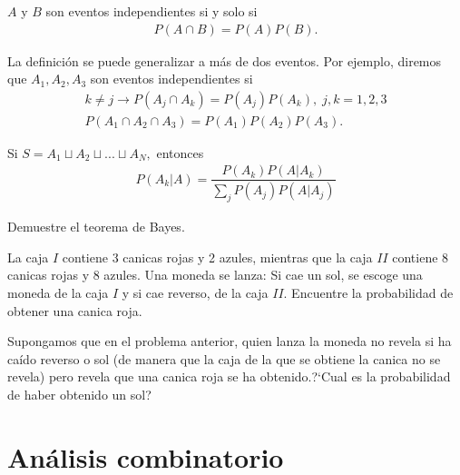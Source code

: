 \begin{defn}
 $A$ y $B$ son eventos independientes si y solo si
 \begin{align}
  \label{eq:0.1.21}
  P(A \cap B) = P(A)P(B).
 \end{align}
\end{defn}


{}
La definición se puede generalizar a más de dos eventos.  Por ejemplo, diremos que $A_{1},A_{2},A_{3}$ son eventos independientes si
\begin{align}
k\neq j \rightarrow P(A_{j} \cap A_{k})=P(A_{j})P(A_{k}), \; j,k=1,2,3 
\\ P(A_{1}\cap A_{2} \cap A_{3})=P(A_{1})P(A_{2})P(A_{3}).
\end{align}


{}
\begin{thm}
 Si $S=A_{1}\sqcup A_{2} \sqcup...\sqcup A_{N},$ entonces
 \begin{align}
  \label{eq:0.1.24}
  P(A_{k}|A) = \dfrac{P(A_{k})P(A|A_{k})}{\sum_{j} P(A_{j})P(A|A_{j})}
 \end{align}

\end{thm}




 \begin{ejemplo}
  \label{exmp:0.1.s16}
  Demuestre el teorema de Bayes.
 \end{ejemplo}



{}
 \begin{ejemplo}
  \label{exmp:0.1.s15}
 La caja $I$ contiene 3 canicas rojas y 2 azules, mientras que la caja $II$ contiene $8$ canicas rojas y 8 azules. Una moneda se lanza: Si cae un sol, se escoge una moneda de la caja $I$ y si cae reverso, de la caja $II.$ Encuentre la probabilidad de obtener una canica roja.
 \end{ejemplo}


{}
 \begin{ejemplo}
  \label{exmp:0.1.s17}
	Supongamos que en el problema anterior, quien lanza la moneda no revela si ha caído reverso o sol (de manera que la caja de la que se obtiene la canica no se revela) pero revela que una canica roja se ha obtenido.?`Cual es la probabilidad de haber obtenido un sol?
 \end{ejemplo}



\section{Análisis combinatorio}

